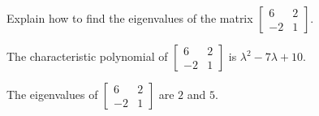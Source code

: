 
\begin{exerciseStatement}


Explain how to find the eigenvalues of the matrix \( \left[\begin{array}{cc}
6 & 2 \\
-2 & 1
\end{array}\right] \).


\end{exerciseStatement}
    
\begin{exerciseAnswer} 


The characteristic polynomial of \( \left[\begin{array}{cc}
6 & 2 \\
-2 & 1
\end{array}\right] \) is \( \lambda^{2} - 7 \lambda + 10 \).



The eigenvalues of \( \left[\begin{array}{cc}
6 & 2 \\
-2 & 1
\end{array}\right] \) are \( 2 \) and \( 5 \).


\end{exerciseAnswer}
    
